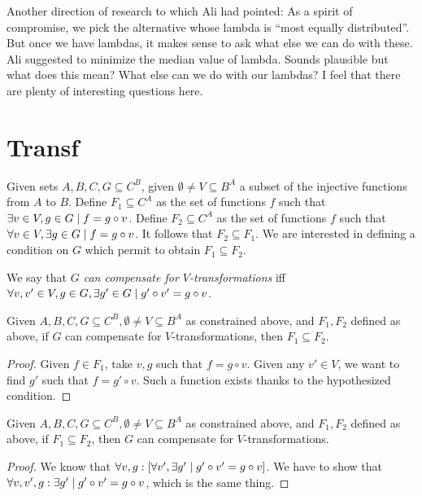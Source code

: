 \documentclass[version=3.21, pagesize, notitlepage, twoside=off, bibliography=totoc, DIV=calc, fontsize=12pt, a4paper]{scrartcl}
\begin{document}
Another direction of research to which Ali had pointed: As a spirit of compromise, we pick the alternative whose lambda is “most equally distributed”. But once we have lambdas, it makes sense to ask what else we can do with these. Ali suggested to minimize the median value of lambda. Sounds plausible but what does this mean? What else can we do with our lambdas? I feel that there are plenty of interesting questions here.




\appendix
\section{Transf}
Given sets $A, B, C, G \subseteq C^B$, given $\emptyset ≠ V \subseteq B^A$ a subset of the injective functions from $A$ to $B$. Define $F_1 \subseteq C^A$ as the set of functions $f$ such that $\exists v \in V, g \in G \suchthat f = g \circ v$. Define $F_2 \subseteq C^A$ as the set of functions $f$ such that $\forall v \in V, \exists g \in G \suchthat f = g \circ v$. It follows that $F_2 \subseteq F_1$. We are interested in defining a condition on $G$ which permit to obtain $F_1 \subseteq F_2$. 

We say that \emph{$G$ can compensate for $V$-transformations} iff $\forall v, v' \in V, g \in G, \exists g' \in G \suchthat g' \circ v' = g \circ v$.%

\begin{lemma}
	Given $A, B, C, G \subseteq C^B, \emptyset ≠ V \subseteq B^A$ as constrained above, and $F_1, F_2$ defined as above, if $G$ can compensate for $V$-transformations, then $F_1 \subseteq F_2$.
\end{lemma}
\begin{proof}
	Given $f \in F_1$, take $v, g$ such that $f = g \circ v$. Given any $v' \in V$, we want to find $g'$ such that $f = g' \circ v$. Such a function exists thanks to the hypothesized condition.
\end{proof}

\begin{lemma}
	Given $A, B, C, G \subseteq C^B, \emptyset ≠ V \subseteq B^A$ as constrained above, and $F_1, F_2$ defined as above, if $F_1 \subseteq F_2$, then $G$ can compensate for $V$-transformations.
\end{lemma}
\begin{proof}
	We know that $\forall v, g: [\forall v', \exists g' \suchthat g' \circ v' = g \circ v]$. We have to show that $\forall v, v', g: \exists g' \suchthat g' \circ v' = g \circ v$, which is the same thing.
\end{proof}
\end{document}
